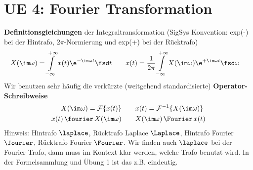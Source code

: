 \clearpage
\section{UE 4: Fourier Transformation}

\textbf{Definitionsgleichungen} der Integraltransformation (SigSys Konvention:
exp(-) bei der Hintrafo, $2\pi$-Normierung und exp(+) bei der Rücktrafo)
\begin{align}
X(\im\omega) = \int\limits_{-\infty}^{+\infty} x(t) \e^{-\im \omega t} \fsd t
&\qquad
x(t)= \frac{1}{2\pi}\int\limits_{-\infty}^{+\infty} X(\im\omega) \e^{+\im \omega t} \fsd \omega
\end{align}
Wir benutzen sehr häufig die verkürzte (weitgehend standardisierte)
\textbf{Operator-Schreibweise}
\begin{align}
X(\im\omega) = \mathcal{F}\{x(t)\}&\qquad x(t) = \mathcal{F}^{-1}\{X(\im\omega)\}\\
x(t) \,\fourier\, X(\im\omega) &\qquad X(\im\omega) \,\Fourier\, x(t)
\end{align}
Hinweis: Hintrafo $\laplace$, Rücktrafo Laplace $\Laplace$, Hintrafo Fourier
$\fourier$, Rücktrafo Fourier $\Fourier$.
Wir finden auch $\laplace$ bei der Fourier Trafo, dann muss im Kontext klar werden,
welche Trafo benutzt wird. In der Formelsammlung und Übung 1 ist das z.B. eindeutig.
%

